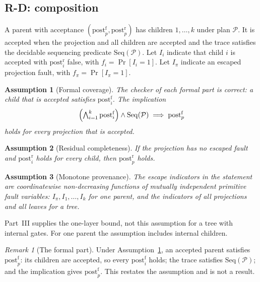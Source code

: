 \documentclass[11pt]{article}
\newtheorem{assumption}{Assumption}
\theoremstyle{definition}
\theoremstyle{remark}
\newtheorem{remark}{Remark}
\newcommand{\postf}{\mathrm{post}^{\mathrm{f}}}
\newcommand{\postr}{\mathrm{post}^{\mathrm{r}}}
\begin{document}
\subsection{R-D: composition}\label{sec:rd}
A parent with acceptance $(\postf_p,\postr_p)$ has children $1,\dots,k$ under plan $\mathcal{P}$.
It is accepted when the projection and all children are accepted and the trace satisfies the
decidable sequencing predicate $\mathrm{Seq}(\mathcal{P})$.
Let $I_i$ indicate that child $i$ is accepted with $\postr_i$ false, with $f_i=\Pr[I_i=1]$.
Let $I_\pi$ indicate an escaped projection fault, with $f_\pi=\Pr[I_\pi=1]$.

\begin{assumption}[Formal coverage]\label{ass:coverage}
The checker of each formal part is correct: a child that is accepted satisfies $\postf_i$. The
implication
\[
\Bigl(\textstyle\bigwedge_{i=1}^{k}\postf_i\Bigr)\wedge\mathrm{Seq}(\mathcal{P})\;\Longrightarrow\;\postf_p
\]
holds for every projection that is accepted.
\end{assumption}

\begin{assumption}[Residual completeness]\label{ass:complete}
If the projection has no escaped fault and $\postr_i$ holds for every child, then $\postr_p$ holds.
\end{assumption}

\begin{assumption}[Monotone provenance]\label{ass:monotone}
The escape indicators in the statement are coordinatewise non-decreasing functions of mutually
independent primitive fault variables: $I_\pi,I_1,\dots,I_k$ for one parent, and the indicators of
all projections and all leaves for a tree.
\end{assumption}
Part~III supplies the one-layer bound, not this assumption for a tree with internal gates.
For one parent the assumption includes internal children.

\begin{remark}[The formal part]\label{rem:formal}
Under Assumption~\ref{ass:coverage}, an accepted parent satisfies $\postf_p$: its children are
accepted, so every $\postf_i$ holds; the trace satisfies $\mathrm{Seq}(\mathcal{P})$; and the
implication gives $\postf_p$. This restates the assumption and is not a result.
\end{remark}
\end{document}

